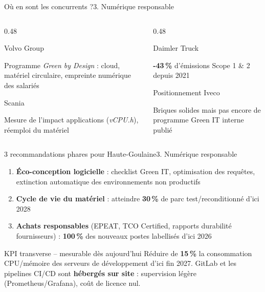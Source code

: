 \documentclass[aspectratio=169,french,12pt]{beamer}
\begin{document}
\begin{frame}{Où en sont les concurrents ?}{3. Numérique responsable}
\vspace{-0.15cm}
\begin{columns}[T]
  \begin{column}{0.48\textwidth}
    \begin{block}{Volvo Group}
      \parbox[c][2.3cm]{\linewidth}{\small
        \raggedright
        Programme \textit{Green by Design} : cloud, matériel circulaire, empreinte numérique des salariés%
      }%
    \end{block}
    \begin{block}{Scania}
      \parbox[c][2.3cm]{\linewidth}{\small
        \raggedright
        Mesure de l'impact applications (\textit{vCPU.h}), réemploi du matériel%
      }%
    \end{block}
  \end{column}
  \begin{column}{0.48\textwidth}
    \begin{block}{Daimler Truck}
      \parbox[c][2.3cm]{\linewidth}{\small
        \raggedright
        \textbf{-43\,\%} d'émissions Scope 1 \& 2 depuis 2021%
      }%
    \end{block}
    \begin{alertblock}{Positionnement Iveco}
      \parbox[c][2.3cm]{\linewidth}{\small
        \raggedright
        Briques solides mais pas encore de programme Green IT interne publié%
      }%
    \end{alertblock}
  \end{column}
\end{columns}
\end{frame}

\begin{frame}{3 recommandations phares pour Haute-Goulaine}{3. Numérique responsable}
\begin{enumerate}
  \item \textbf{Éco-conception logicielle} : checklist Green IT, optimisation des requêtes, extinction automatique des environnements non productifs
  \item \textbf{Cycle de vie du matériel} : atteindre \textbf{30\,\%} de parc test/reconditionné d'ici 2028
  \item \textbf{Achats responsables} (EPEAT, TCO Certified, rapports durabilité fournisseurs) : \textbf{100\,\%} des nouveaux postes labellisés d'ici 2026
\end{enumerate}
\vspace{0.3cm}
\begin{block}{KPI transverse -- mesurable dès aujourd'hui}
  Réduire de \textbf{15\,\%} la consommation CPU/mémoire des serveurs de développement d'ici fin 2027. GitLab et les pipelines CI/CD sont \textbf{hébergés sur site} : supervision légère (Prometheus/Grafana), coût de licence nul.
\end{block}
\end{frame}
\end{document}
